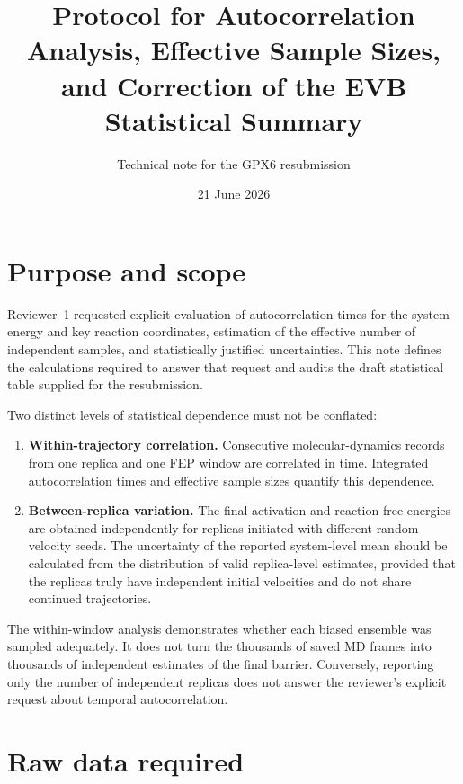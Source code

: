 \documentclass[11pt,a4paper]{article}
\title{Protocol for Autocorrelation Analysis, Effective Sample Sizes,\\
and Correction of the EVB Statistical Summary}
\author{Technical note for the GPX6 resubmission}
\date{21 June 2026}
\begin{document}
\maketitle

\section{Purpose and scope}

Reviewer~1 requested explicit evaluation of autocorrelation times for the system energy and key reaction coordinates, estimation of the effective number of independent samples, and statistically justified uncertainties. This note defines the calculations required to answer that request and audits the draft statistical table supplied for the resubmission.

Two distinct levels of statistical dependence must not be conflated:
\begin{enumerate}
  \item \textbf{Within-trajectory correlation.} Consecutive molecular-dynamics records from one replica and one FEP window are correlated in time. Integrated autocorrelation times and effective sample sizes quantify this dependence.
  \item \textbf{Between-replica variation.} The final activation and reaction free energies are obtained independently for replicas initiated with different random velocity seeds. The uncertainty of the reported system-level mean should be calculated from the distribution of valid replica-level estimates, provided that the replicas truly have independent initial velocities and do not share continued trajectories.
\end{enumerate}

The within-window analysis demonstrates whether each biased ensemble was sampled adequately. It does not turn the thousands of saved MD frames into thousands of independent estimates of the final barrier. Conversely, reporting only the number of independent replicas does not answer the reviewer's explicit request about temporal autocorrelation.

\section{Raw data required}
\end{document}
